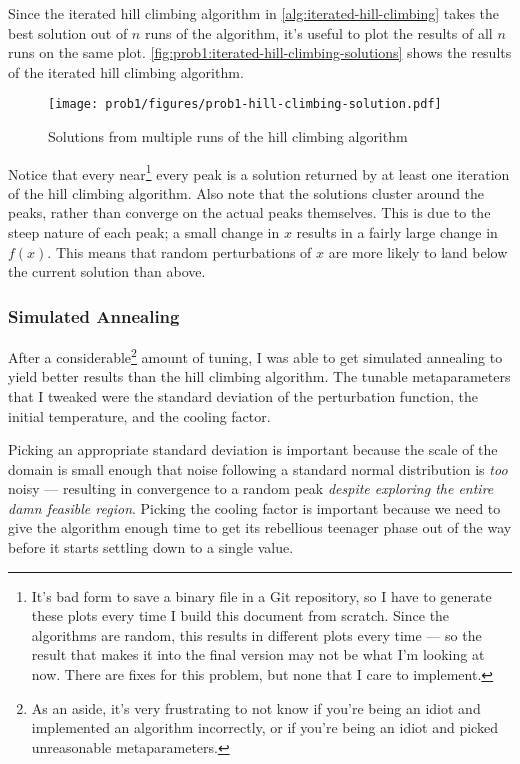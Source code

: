 \documentclass{article}
\begin{document}
Since the iterated hill climbing algorithm in \autoref{alg:iterated-hill-climbing} takes the best
solution out of $n$ runs of the algorithm, it's useful to plot the results of all $n$ runs on the
same plot. \autoref{fig:prob1:iterated-hill-climbing-solutions} shows the results of the iterated
hill climbing algorithm.

\begin{figure}[h]
    \centering
    \texttt{[image: prob1/figures/prob1-hill-climbing-solution.pdf]}
    \caption{Solutions from multiple runs of the hill climbing
        algorithm}\label{fig:prob1:iterated-hill-climbing-solutions}
\end{figure}

Notice that every near\footnote{It's bad form to save a binary file in a Git repository, so I have
    to generate these plots every time I build this document from scratch. Since the algorithms are
    random, this results in different plots every time --- so the result that makes it into the
    final version may not be what I'm looking at now. There are fixes for this problem, but none
    that I care to implement.} every peak is a solution returned by at least one iteration of the
hill climbing algorithm. Also note that the solutions cluster around the peaks, rather than
converge on the actual peaks themselves. This is due to the steep nature of each peak; a small
change in $x$ results in a fairly large change in $f(x)$. This means that random perturbations of
$x$ are more likely to land below the current solution than above.

\subsubsection{Simulated Annealing}

After a considerable\footnote{As an aside, it's very frustrating to not know if you're being an
    idiot and implemented an algorithm incorrectly, or if you're being an idiot and picked
    unreasonable metaparameters.} amount of tuning, I was able to get simulated annealing to yield
better results than the hill climbing algorithm. The tunable metaparameters that I tweaked were the
standard deviation of the perturbation function, the initial temperature, and the cooling factor.

Picking an appropriate standard deviation is important because the scale of the domain is small
enough that noise following a standard normal distribution is \textit{too} noisy --- resulting in
convergence to a random peak \textit{despite exploring the entire damn feasible region}. Picking
the cooling factor is important because we need to give the algorithm enough time to get its
rebellious teenager phase out of the way before it starts settling down to a single value.
\end{document}
